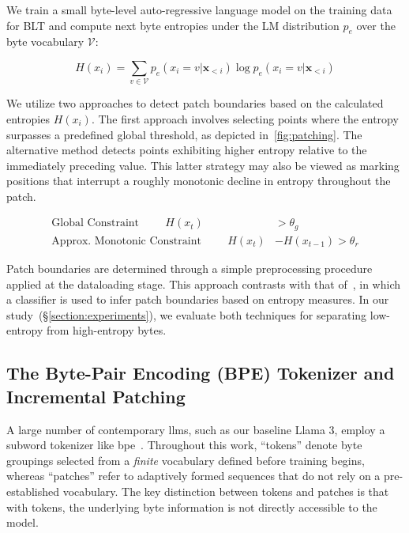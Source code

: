 We train a small byte-level auto-regressive language model on the training data for {\textsc BLT} and compute next byte entropies under the LM distribution $p_{e}$ over the byte vocabulary $\mathcal{V}$:

\begin{equation}
H(x_i) = \sum_{v \in \mathcal{V}} p_{e}(x_i=v|\pmb{x}_{<i}) \log p_{e}(x_i=v|\pmb{x}_{<i})
\end{equation}

We utilize two approaches to detect patch boundaries based on the calculated entropies $H(x_i)$. The first approach involves selecting points where the entropy surpasses a predefined global threshold, as depicted in~\autoref{fig:patching}. The alternative method detects points exhibiting higher entropy relative to the immediately preceding value. This latter strategy may also be viewed as marking positions that interrupt a roughly monotonic decline in entropy throughout the patch.

\begin{align*}
    \text{Global Constraint}\hspace{1cm}H(x_t)& > \theta_g\\
    \text{Approx. Monotonic Constraint}\hspace{1cm}H(x_t)& - H(x_{t-1}) > \theta_r
\end{align*}

Patch boundaries are determined through a simple preprocessing procedure applied at the dataloading stage. This approach contrasts with that of~\citet{nawrot-etal-2023-efficient}, in which a classifier is used to infer patch boundaries based on entropy measures. In our study~(\S\ref{section:experiments}), we evaluate both techniques for separating low-entropy from high-entropy bytes.

\subsection{The Byte-Pair Encoding (BPE) Tokenizer and Incremental Patching}
\label{section:incremental-patching}
\label{section:bpe-patch}

A large number of contemporary llms, such as our baseline Llama 3, employ a subword tokenizer like bpe~\citep{gage1994new, sennrich-etal-2016-neural}. Throughout this work, ``tokens'' denote byte groupings selected from a \textit{finite} vocabulary defined before training begins, whereas ``patches'' refer to adaptively formed sequences that do not rely on a pre-established vocabulary. The key distinction between tokens and patches is that with tokens, the underlying byte information is not directly accessible to the model.

